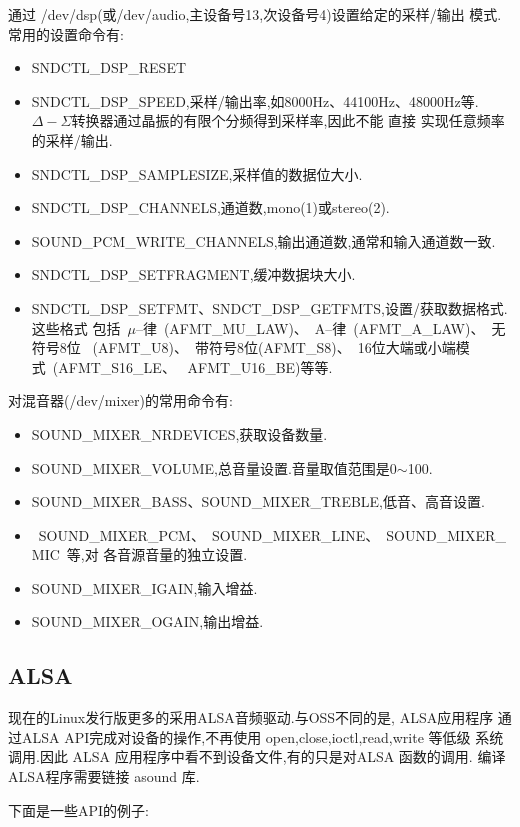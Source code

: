	通过 /dev/dsp(或/dev/audio,主设备号13,次设备号4)设置给定的采样/输出
模式.常用的设置命令有:
\begin{itemize}\itemsep=-3pt
  \item SNDCTL\_DSP\_RESET
  \item SNDCTL\_DSP\_SPEED,采样/输出率,如8000Hz、44100Hz、48000Hz等.
		$\Delta-\Sigma$转换器通过晶振的有限个分频得到采样率,因此不能 直接
        实现任意频率的采样/输出.
  \item SNDCTL\_DSP\_SAMPLESIZE,采样值的数据位大小.
  \item SNDCTL\_DSP\_CHANNELS,通道数,mono(1)或stereo(2).
  \item SOUND\_PCM\_WRITE\_CHANNELS,输出通道数,通常和输入通道数一致.
  \item SNDCTL\_DSP\_SETFRAGMENT,缓冲数据块大小.
  \item SNDCTL\_DSP\_SETFMT、SNDCT\_DSP\_GETFMTS,设置/获取数据格式.这些格式
		包括~$\mu$--律~(AFMT\_MU\_LAW)、~A--律~(AFMT\_A\_LAW)、~无符号8位~
		(AFMT\_U8)、~带符号8位(AFMT\_S8)、~16位大端或小端模式~(AFMT\_S16\_LE、
		~AFMT\_U16\_BE)等等.
\end{itemize}

	对混音器(/dev/mixer)的常用命令有:
\begin{itemize}\itemsep=-3pt
  \item SOUND\_MIXER\_NRDEVICES,获取设备数量.
  \item SOUND\_MIXER\_VOLUME,总音量设置.音量取值范围是0$\sim$100.
  \item SOUND\_MIXER\_BASS、SOUND\_MIXER\_TREBLE,低音、高音设置.
  \item ~SOUND\_MIXER\_PCM、~SOUND\_MIXER\_LINE、~SOUND\_MIXER\_MIC~等,对
		各音源音量的独立设置. 
  \item SOUND\_MIXER\_IGAIN,输入增益.
  \item SOUND\_MIXER\_OGAIN,输出增益.
\end{itemize}

\subsection{ALSA}
	现在的Linux发行版更多的采用ALSA音频驱动.与OSS不同的是, ALSA应用程序
通过ALSA API完成对设备的操作,不再使用 open,close,ioctl,read,write 等低级
系统调用.因此 ALSA 应用程序中看不到设备文件,有的只是对ALSA 函数的调用.
编译ALSA程序需要链接 asound 库.

	下面是一些API的例子:

